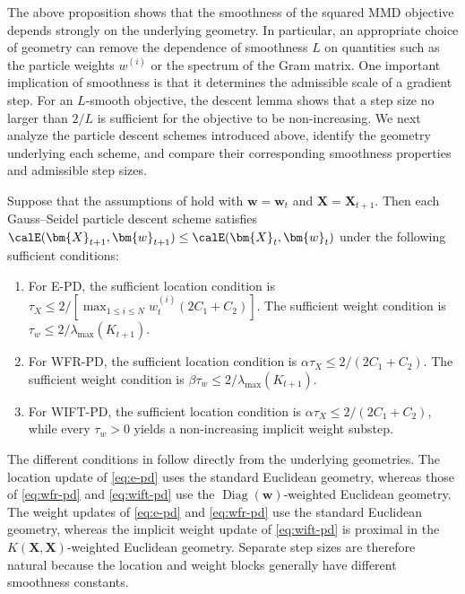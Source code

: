 The above proposition shows that the smoothness of the squared MMD objective depends strongly on the underlying geometry. In particular, an appropriate choice of geometry can remove the dependence of smoothness $L$ on quantities such as the particle weights $w^{(i)}$ or the spectrum of the Gram matrix. 
One important implication of smoothness is that it determines the admissible scale of a gradient step. For an $L$-smooth objective, the descent lemma shows that a step size no larger than $2/L$ is sufficient for the objective to be non-increasing.
We next analyze the particle descent schemes introduced above, identify the geometry underlying each scheme, and compare their corresponding smoothness properties and admissible step sizes. 

\begin{prop}
\label{prop:geometry-step-sizes}
Suppose that the assumptions of  hold with $\bm{w}=\bm{w}_t$ and $\bm{X}=\bm{X}_{t+1}$. Then each Gauss--Seidel particle descent scheme satisfies $\calE(\bm{X}_{t+1},\bm{w}_{t+1})\leq\calE(\bm{X}_t,\bm{w}_t)$ under the following sufficient conditions:
\begin{enumerate}
    \item For E-PD, the sufficient location condition is $\tau_X\leq 2/[\max_{1\leq i\leq N}w_t^{(i)}(2C_1+C_2)]$. The sufficient weight condition is $\tau_w\leq 2/\lambda_{\max}(K_{t+1})$.
    \item For WFR-PD, the sufficient location condition is $\alpha\tau_X\leq 2/(2C_1+C_2)$. The sufficient weight condition is $\beta\tau_w\leq 2/\lambda_{\max}(K_{t+1})$.
    \item For WIFT-PD, the sufficient location condition is $\alpha\tau_X\leq 2/(2C_1+C_2)$, while every $\tau_w>0$ yields a non-increasing implicit weight substep.
\end{enumerate}
\end{prop}

The different conditions in  follow directly from the underlying geometries. The location update of \eqref{eq:e-pd} uses the standard Euclidean geometry, whereas those of \eqref{eq:wfr-pd} and \eqref{eq:wift-pd} use the $\operatorname{Diag}(\bm{w})$-weighted Euclidean geometry. The weight updates of \eqref{eq:e-pd} and \eqref{eq:wfr-pd} use the standard Euclidean geometry, whereas the implicit weight update of \eqref{eq:wift-pd} is proximal in the $K(\bm{X},\bm{X})$-weighted Euclidean geometry. Separate step sizes are therefore natural because the location and weight blocks generally have different smoothness constants.
    
